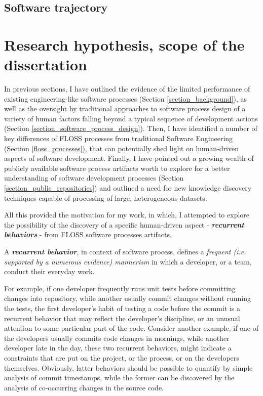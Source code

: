 \subsection{Software trajectory}

%
%
\section{Research hypothesis, scope of the dissertation}\label{section_research_hypothesis}
In previous sections, I have outlined the evidence of the limited performance of existing engineering-like 
software processes (Section \ref{section_background}),
as well as the oversight by traditional approaches to software process design 
of a variety of human factors falling beyond a typical sequence of development actions  
(Section \ref{section_software_process_design}).
Then, I have identified a number of key differences of FLOSS processes from traditional Software Engineering 
(Section \ref{floss_processes}), that can potentially shed light on human-driven aspects of software development.
Finally, I have pointed out a growing wealth of publicly available software process artifacts worth to explore 
for a better understanding of software development processes (Section \ref{section_public_repositories}) and 
outlined a need for new knowledge discovery techniques capable of processing of large, heterogeneous datasets.

All this provided the motivation for my work, in which, I attempted to explore the possibility of the discovery 
of a specific human-driven aspect - \textit{\textbf{recurrent behaviors}} - from FLOSS software processes artifacts.
\begin{defn}\label{def_process}
A \textbf{\textit{recurrent behavior}}, in context of software process, defines a \textit{frequent 
(i.e. supported by a numerous evidence) mannerism} in which a developer, or a team, conduct their everyday work.
\end{defn}

For example, if one developer frequently runs unit tests before committing 
changes into repository, while another usually commit changes without running the tests, the first developer's
habit of testing a code before the commit is a recurrent behavior that may reflect the developer's discipline,
or an unusual attention to some particular part of the code. 
Consider another example, if one of the developers usually commits code changes in mornings, while another 
developer late in the day, these two recurrent behaviors, might indicate a constraints that are put on the 
project, or the process, or on the developers themselves.
Obviously, latter behaviors should be possible to quantify by simple analysis of commit timestamps, while 
the former can be discovered by the analysis of co-occurring changes in the source code. 

